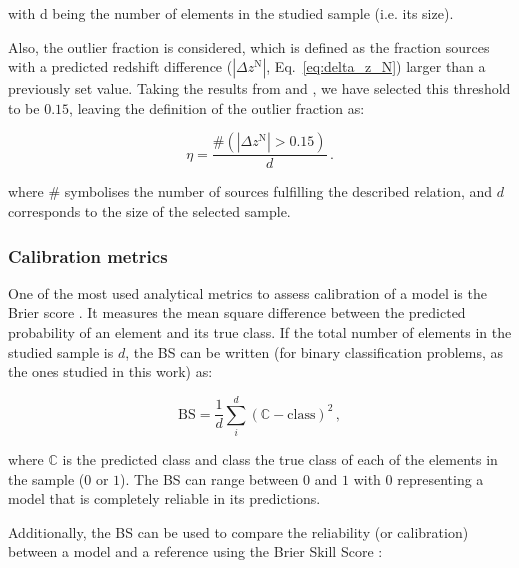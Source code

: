 \documentclass{aa}
\begin{document}
\noindent with d being the number of elements in the studied sample (i.e. its size).

Also, the outlier fraction \citep[$\eta$, as used in][]{2013ApJ...775...93D, 2022A&C....3800510L} is considered, which is defined as the fraction sources with a predicted redshift difference ($\left|\Delta z^{\mathrm{N}}\right|$, Eq.~\ref{eq:delta_z_N}) larger than a previously set value. Taking the results from \citet{2009ApJ...690.1236I} and \citet{2010A&A...523A..31H}, we have selected this threshold to be $0.15$, leaving the definition of the outlier fraction as:

\begin{equation}\label{eq:outlier_fraction}
\eta = \frac{\# \left( \left|\Delta z^{\mathrm{N}}\right| > 0.15 \right)}{d}\,.
\end{equation}

\noindent where $\#$ symbolises the number of sources fulfilling the described relation, and $d$ corresponds to the size of the selected sample.


\subsubsection{Calibration metrics}\label{sec:metrics_calibration}

One of the most used analytical metrics to assess calibration of a model is the Brier score \citep[BS;][]{Brier_1950}. It measures the mean square difference between the predicted probability of an element and its true class. If the total number of elements in the studied sample is $d$, the BS can be written (for binary classification problems, as the ones studied in this work) as:

\begin{equation}\label{eq:brier_score}
\mathrm{BS} = \frac{1}{d} \sum_{i}^{d}(\mathbb{C} - \mathrm{class})^{2}\,,
\end{equation}

\noindent where $\mathbb{C}$ is the predicted class and \textrm{class} the true class of each of the elements in the sample ($0$ or $1$).
The BS can range between $0$ and $1$ with $0$ representing a model that is completely reliable in its predictions.

Additionally, the BS can be used to compare the reliability (or calibration) between a model and a reference using the Brier Skill Score \citep[BSS; e.g.][]{Glahn_1970}:
\end{document}
